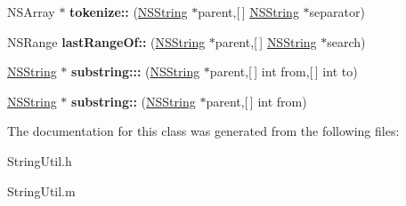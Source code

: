 \begin{DoxyCompactItemize}
\item 
\hypertarget{interface_string_util_a71301e03736decc69065fc6e3dbf71d4}{
\-N\-S\-Array $\ast$ {\bfseries tokenize\-::} (\hyperlink{class_n_s_string}{\-N\-S\-String} $\ast$parent,\mbox{[}$\,$\mbox{]} \hyperlink{class_n_s_string}{\-N\-S\-String} $\ast$separator)}
\label{interface_string_util_a71301e03736decc69065fc6e3dbf71d4}

\item 
\hypertarget{interface_string_util_a84a04a7b62773715e56d33d94df8b360}{
\-N\-S\-Range {\bfseries last\-Range\-Of\-::} (\hyperlink{class_n_s_string}{\-N\-S\-String} $\ast$parent,\mbox{[}$\,$\mbox{]} \hyperlink{class_n_s_string}{\-N\-S\-String} $\ast$search)}
\label{interface_string_util_a84a04a7b62773715e56d33d94df8b360}

\item 
\hypertarget{interface_string_util_a0b8779d7bf0ce60fab42056925e09177}{
\hyperlink{class_n_s_string}{\-N\-S\-String} $\ast$ {\bfseries substring\-:::} (\hyperlink{class_n_s_string}{\-N\-S\-String} $\ast$parent,\mbox{[}$\,$\mbox{]} int from,\mbox{[}$\,$\mbox{]} int to)}
\label{interface_string_util_a0b8779d7bf0ce60fab42056925e09177}

\item 
\hypertarget{interface_string_util_a0c689e7fdd9f1d79e2b69af0f40e1a4f}{
\hyperlink{class_n_s_string}{\-N\-S\-String} $\ast$ {\bfseries substring\-::} (\hyperlink{class_n_s_string}{\-N\-S\-String} $\ast$parent,\mbox{[}$\,$\mbox{]} int from)}
\label{interface_string_util_a0c689e7fdd9f1d79e2b69af0f40e1a4f}

\end{DoxyCompactItemize}


\-The documentation for this class was generated from the following files\-:\begin{DoxyCompactItemize}
\item 
\-String\-Util.\-h\item 
\-String\-Util.\-m\end{DoxyCompactItemize}
